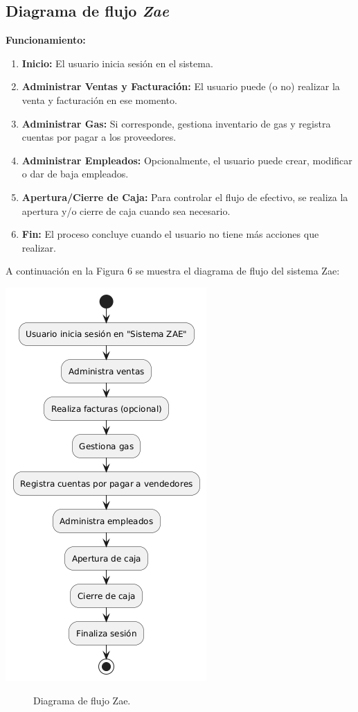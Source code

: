 \documentclass[protocolo.tex]{subfiles}
\begin{document}
\subsection{Diagrama de flujo \textit{Zae}} 
\textbf{Funcionamiento:}
\begin{enumerate}
    \item \textbf{Inicio: }  
    El usuario inicia sesión en el sistema.
    \item \textbf{Administrar Ventas y Facturación:}  
    El usuario puede (o no) realizar la venta y facturación en ese momento.
    \item \textbf{Administrar Gas:}  
    Si corresponde, gestiona inventario de gas y registra cuentas por pagar a los proveedores.
    \item \textbf{Administrar Empleados:} 
    Opcionalmente, el usuario puede crear, modificar o dar de baja empleados.
    \item \textbf{Apertura/Cierre de Caja:} 
    Para controlar el flujo de efectivo, se realiza la apertura y/o cierre de caja cuando sea necesario.
    \item \textbf{Fin:}
    El proceso concluye cuando el usuario no tiene más acciones que realizar.  
\end{enumerate}

A continuación en la Figura 6 se muestra el diagrama de flujo del sistema Zae:\vspace{4mm}


\begin{center}
\includegraphics[scale=0.6]{Imagenes/Pdf/zaeF.png}
\end{center}
\begin{figure}[h]  %
    \centering
    \caption{Diagrama de flujo Zae.}
    \label{fig:mi-figura6}
\end{figure}
\end{document}
